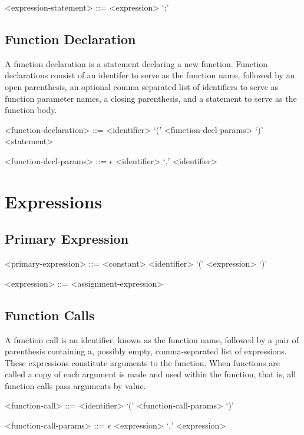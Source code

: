 \begin{grammar}
<expression-statement> ::= <expression> `;'
\end{grammar}

\subsection{Function Declaration}
A function declaration is a statement declaring a new function.  Function declarations consist of an identifer to serve as the function name, followed by an open parenthesis, an optional comma separated list of identifiers to serve as function parameter names, a closing parenthesis, and a statement to serve as the function body.

\begin{grammar}
<function-declaration> ::= <identifier> `(' <function-decl-params> `)' <statement> 

<function-decl-params> ::= $\epsilon$
\alt <identifier>
 `,' <identifier>
\end{grammar}

\section{Expressions}
\label{sec:expressions}

\subsection{Primary Expression}

\begin{grammar}
<primary-expression> ::= <constant>
\alt <identifier>
\alt `(' <expression> `)'

<expression> ::= <assignment-expression>
\end{grammar}

\subsection{Function Calls}
A function call is an identifier, known as the function name, followed by a pair of parenthesis containing a, possibly empty, comma-separated list of expressions.  These expressions constitute arguments to the function.  When functions are called a copy of each argument is made and used within the function, that is, all function calls pass arguments by value.
\begin{grammar}
<function-call> ::= <identifier> `(' <function-call-params> `)'

<function-call-params> ::= $\epsilon$
\alt <expression>
 `,' <expression>
\end{grammar}

